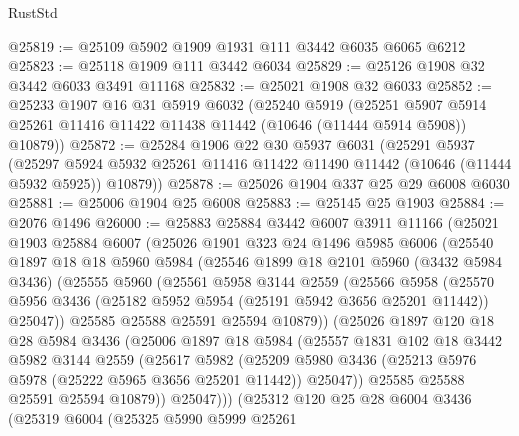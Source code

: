 \begin{lexlean}{RustStd}
\begin{coremodule}
@25819 := @25109 @5902 @1909 @1931 @111 @3442 @6035 @6065 @6212
@25823 := @25118 @1909 @111 @3442 @6034
@25829 := @25126 @1908 @32 @3442 @6033 @3491 @11168
@25832 := @25021 @1908 @32 @6033
@25852 := @25233
    @1907
    @16
    @31
    @5919
    @6032
    (@25240
      @5919
      (@25251 @5907 @5914 @25261 @11416 @11422 @11438 @11442 (@10646 (@11444 @5914 @5908)) @10879))
@25872 := @25284
    @1906
    @22
    @30
    @5937
    @6031
    (@25291
      @5937
      (@25297 @5924 @5932 @25261 @11416 @11422 @11490 @11442 (@10646 (@11444 @5932 @5925)) @10879))
@25878 := @25026 @1904 @337 @25 @29 @6008 @6030
@25881 := @25006 @1904 @25 @6008
@25883 := @25145 @25 @1903
@25884 := @2076 @1496
@26000 := @25883
    @25884
    @3442
    @6007
    @3911
    @11166
    (@25021
      @1903
      @25884
      @6007
      (@25026
        @1901
        @323
        @24
        @1496
        @5985
        @6006
        (@25540
          @1897
          @18
          @18
          @5960
          @5984
          (@25546
            @1899
            @18
            @2101
            @5960
            (@3432 @5984 @3436)
            (@25555
              @5960
              (@25561
                @5958
                @3144
                @2559
                (@25566
                  @5958
                  (@25570
                    @5956
                    @3436
                    (@25182 @5952 @5954 (@25191 @5942 @3656 @25201 @11442))
                    @25047))
                @25585
                @25588
                @25591
                @25594
                @10879))
            (@25026
              @1897
              @120
              @18
              @28
              @5984
              @3436
              (@25006
                @1897
                @18
                @5984
                (@25557
                  @1831
                  @102
                  @18
                  @3442
                  @5982
                  @3144
                  @2559
                  (@25617
                    @5982
                    (@25209
                      @5980
                      @3436
                      (@25213 @5976 @5978 (@25222 @5965 @3656 @25201 @11442))
                      @25047))
                  @25585
                  @25588
                  @25591
                  @25594
                  @10879))
              @25047)))
        (@25312
          @120
          @25
          @28
          @6004
          @3436
          (@25319
            @6004
            (@25325
              @5990
              @5999
              @25261

\end{coremodule}
\end{lexlean}
